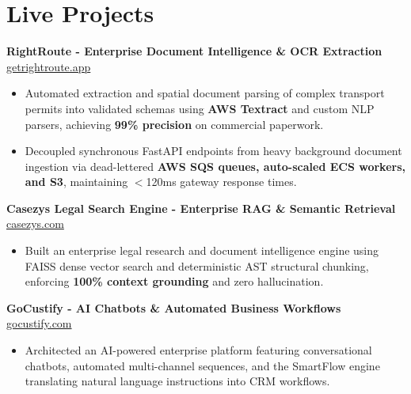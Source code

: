 \documentclass[9.5pt,a4paper]{article}
\begin{document}
\section*{Live Projects}
\noindent
\textbf{RightRoute - Enterprise Document Intelligence \& OCR Extraction} \hfill \href{https://getrightroute.app}{getrightroute.app}
\begin{itemize}
    \item Automated extraction and spatial document parsing of complex transport permits into validated schemas using \textbf{AWS Textract} and custom NLP parsers, achieving \textbf{99\% precision} on commercial paperwork.
    \item Decoupled synchronous FastAPI endpoints from heavy background document ingestion via dead-lettered \textbf{AWS SQS queues, auto-scaled ECS workers, and S3}, maintaining $<$120ms gateway response times.
\end{itemize}
\vspace{0.6pt}
\noindent
\textbf{Casezys Legal Search Engine - Enterprise RAG \& Semantic Retrieval} \hfill \href{https://casezys.com}{casezys.com}
\begin{itemize}
    \item Built an enterprise legal research and document intelligence engine using FAISS dense vector search and deterministic AST structural chunking, enforcing \textbf{100\% context grounding} and zero hallucination.
\end{itemize}
\vspace{0.6pt}
\noindent
\textbf{GoCustify - AI Chatbots \& Automated Business Workflows} \hfill \href{https://gocustify.com}{gocustify.com}
\begin{itemize}
    \item Architected an AI-powered enterprise platform featuring conversational chatbots, automated multi-channel sequences, and the SmartFlow engine translating natural language instructions into CRM workflows.
\end{itemize}
\vspace{0.6pt}
\end{document}

